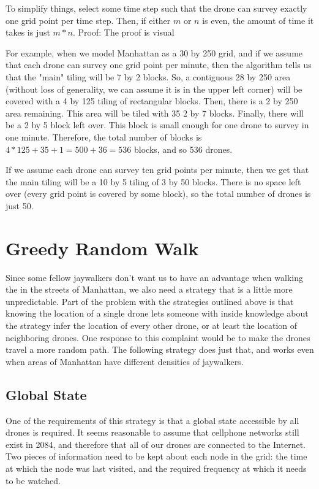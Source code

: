 \documentclass{article}
\begin{document}
To simplify things, select some time step such that the drone can survey exactly one grid point per time step. Then, if either $m$ or $n$ is even, the amount of time it takes is just $m*n$. Proof: The proof is visual

For example, when we model Manhattan as a 30 by 250 grid, and if we assume that each drone can survey one grid point per minute, then the algorithm tells us that the "main" tiling will be 7 by 2 blocks. So, a contiguous 28 by 250 area (without loss of generality, we can assume it is in the upper left corner) will be covered with a 4 by 125 tiling of rectangular blocks. Then, there is a 2 by 250 area remaining. This area will be tiled with 35 2 by 7 blocks. Finally, there will be a 2 by 5 block left over. This block is small enough for one drone to survey in one minute. Therefore, the total number of blocks is $4*125 + 35 + 1 = 500 + 36 = 536$ blocks, and so 536 drones.

If we assume each drone can survey ten grid points per minute, then we get that the main tiling will be a 10 by 5 tiling of 3 by 50 blocks. There is no space left over (every grid point is covered by some block), so the total number of drones is just 50.

\section{Greedy Random Walk}
\label{sec:greedy_random_walk_model}
Since some fellow jaywalkers don't want us to have an advantage when walking the in the streets of Manhattan, we also need a strategy that is a little more unpredictable. Part of the problem with the strategies outlined above is that knowing the location of a single drone lets someone with inside knowledge about the strategy infer the location of every other drone, or at least the location of neighboring drones. One response to this complaint would be to make the drones travel a more random path. The following strategy does just that, and works even when areas of Manhattan have different densities of jaywalkers.

\subsection{Global State}
\label{sub:global_state}
One of the requirements of this strategy is that a global state accessible by all drones is required. It seems reasonable to assume that cellphone networks still exist in 2084, and therefore that all of our drones are connected to the Internet. Two pieces of information need to be kept about each node in the grid: the time at which the node was last visited, and the required frequency at which it needs to be watched.
\end{document}
